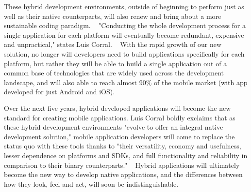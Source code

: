 \documentclass[11pt, twocolumn]{article}
\begin{document}
These hybrid development environments, outside of beginning to perform just as well as their native counterparts, will also renew and bring about a more sustainable coding paradigm. ~\cite{Goaer2013}  "Conducting the whole development process for a single application for each platform will eventually become redundant, expensive and unpractical," states Luis Corral. ~\cite{Corral2011}  With the rapid growth of our new solution, no longer will developers need to build applications specifically for each platform, but rather they will be able to build a single application out of a common base of technologies that are widely used across the development landscape, and will also able to reach almost 90\% of the mobile market (with app developed for just Android and iOS). ~\cite{Llamas2013}

Over the next five years, hybrid developed applications will become the new standard for creating mobile applications. Luis Corral boldly exclaims that as these hybrid development environments "evolve to offer an integral native development solution," mobile application developers will come to replace the status quo with these tools thanks to "their versatility, economy and usefulness, lesser dependence on platforms and SDKs, and full functionality and reliability in comparison to their binary counterparts." ~\cite{Corral2011}  Hybrid applications will ultimately become the new way to develop native applications, and the differences between how they look, feel and act, will soon be indistinguishable.\\




\end{document}
